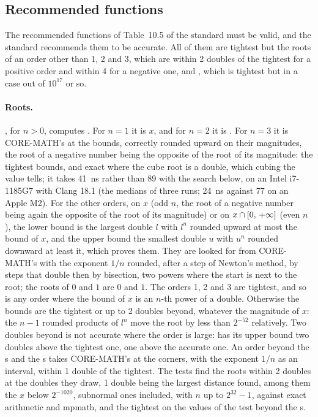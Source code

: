\subsection{Recommended functions}\label{sec:accuracy-recommended}

The recommended functions of Table~10.5 of the standard must be valid, and
the standard recommends them to be accurate. All of them are tightest but
the roots of an order other than 1, 2 and 3, which are within 2 doubles of
the tightest for a positive order and within 4 for a negative one, and
, which is tightest but in a case out of $10^{17}$ or so.

\paragraph{Roots.}%
, for $n>0$, computes . For $n=1$ it is
$x$, and for $n=2$ it is . For $n=3$ it is CORE-MATH's
 at the bounds, correctly rounded upward on their magnitudes,
the root of a negative number being the opposite of the root of its
magnitude: the tightest bounds, and exact where the cube root is a double,
which cubing the value tells; it takes 41~ns rather than 89 with the
search below, on an Intel i7-1185G7 with Clang 18.1 (the medians of three
runs; 24~ns against 77 on an Apple M2).\newinvfive{} For the
other orders, on $x$ (odd $n$, the root of a negative number being again
the opposite of the root of its magnitude) or on $x\cap[0,\,+\infty]$
(even $n$), the lower bound is the largest double $l$ with $l^n$ rounded
upward at most the bound of $x$, and the upper bound the smallest double
$u$ with $u^n$ rounded downward at least it, which proves them. They are
looked for from CORE-MATH's  with the exponent $1/n$ rounded,
after a step of Newton's method, by steps that double then by bisection,
two powers where the start is next to the root; the roots of $0$ and $1$
are $0$ and $1$. The orders 1, 2 and 3 are tightest, and so is any order
where the bound of $x$ is an $n$-th power of a double. Otherwise the bounds are the tightest or up to 2 doubles beyond, whatever the magnitude of $x$: the $n-1$ rounded products of $l^n$ move the root by less than $2^{-52}$ relatively. Two doubles beyond is not accurate where the order is large:  has its upper bound two doubles above the tightest one, one above the accurate one. An order beyond the s and
the s takes CORE-MATH's  at the corners, with
the exponent $1/n$ as an interval, within 1 double of the
tightest.\newinvfive{} The tests find the roots within 2 doubles at the
doubles they draw, 1 double being the largest distance found, among them the $x$
below $2^{-1020}$, subnormal ones included, with $n$ up to $2^{32}-1$,
against exact arithmetic and mpmath, and the tightest on the values of the
test  beyond the s.

